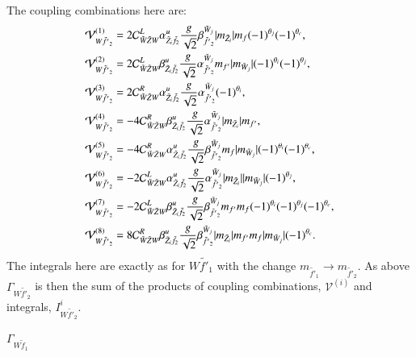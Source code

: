 \documentclass[final,3p,times,pdflatex]{elsarticle}
\begin{document}
The coupling combinations here are:
\begin{align}
\mathcal{V}_{W \tilde{f'}_2}^{(1)} &= 2 \mathcal{C}_{\tilde{W} \tilde{Z} W}^L \alpha_{\tilde{Z}_i \tilde{f}_2}^{u} {g \over \sqrt{2}} \beta_{\tilde{f'}_2}^{\tilde{W}_j} |m_{\tilde{Z}_i}| m_{f}(-1)^{\theta_j}(-1)^{\theta_c}, \\
\mathcal{V}_{W \tilde{f'}_2}^{(2)} &= 2 \mathcal{C}_{\tilde{W} \tilde{Z} W}^L \beta_{\tilde{Z}_i \tilde{f}_2}^{u} {g \over \sqrt{2}} \alpha_{\tilde{f'}_2}^{\tilde{W}_j} m_{f'}|m_{\tilde{W}_j}|(-1)^{\theta_i}(-1)^{\theta_j}, \\
\mathcal{V}_{W \tilde{f'}_2}^{(3)} &= 2 \mathcal{C}_{\tilde{W} \tilde{Z} W}^R \alpha_{\tilde{Z}_i \tilde{f}_2}^{u} {g \over \sqrt{2}} \alpha_{\tilde{f'}_2}^{\tilde{W}_j}(-1)^{\theta_i}, \\
\mathcal{V}_{W \tilde{f'}_2}^{(4)} &= -4 \mathcal{C}_{\tilde{W} \tilde{Z} W}^R \beta_{\tilde{Z}_i \tilde{f}_2}^{u} {g \over \sqrt{2}} \alpha_{\tilde{f'}_2}^{\tilde{W}_j}|m_{\tilde{Z}_i}|m_{f'}, \\
\mathcal{V}_{W \tilde{f'}_2}^{(5)} &= -4 \mathcal{C}_{\tilde{W} \tilde{Z} W}^R \alpha_{\tilde{Z}_i \tilde{f}_2}^{u} {g \over \sqrt{2}} \beta_{\tilde{f'}_2}^{\tilde{W}_j}m_{f}|m_{\tilde{W}_j}|(-1)^{\theta_i}(-1)^{\theta_c}, \\
\mathcal{V}_{W \tilde{f'}_2}^{(6)} &= -2 \mathcal{C}_{\tilde{W} \tilde{Z} W}^L \alpha_{\tilde{Z}_i \tilde{f}_2}^{u} {g \over \sqrt{2}} \alpha_{\tilde{f'}_2}^{\tilde{W}_j} |m_{\tilde{Z}_i}||m_{\tilde{W}_j}|(-1)^{\theta_j}, \\
\mathcal{V}_{W \tilde{f'}_2}^{(7)} &= -2 \mathcal{C}_{\tilde{W} \tilde{Z} W}^L \beta_{\tilde{Z}_i \tilde{f}_2}^{u} {g \over \sqrt{2}} \beta_{\tilde{f'}_2}^{\tilde{W}_j} m_{f'} m_{f} (-1)^{\theta_i}(-1)^{\theta_j} (-1)^{\theta_c}, \\
\mathcal{V}_{W \tilde{f'}_2}^{(8)} &= 8 \mathcal{C}_{\tilde{W} \tilde{Z} W}^R \beta_{\tilde{Z}_i \tilde{f}_2}^{u} {g \over \sqrt{2}} \beta_{\tilde{f'}_2}^{\tilde{W}_j} |m_{\tilde{Z}_i}| m_{f'} m_{f}|m_{\tilde{W}_j}|(-1)^{\theta_c}.
\end{align}
The integrals here are exactly as for $W \tilde{f'}_1$ with the change $m_{\tilde{f'}_1} \rightarrow m_{\tilde{f'}_2}$. As above $\Gamma_{W \tilde{f'}_2}$ is then the sum of the products of coupling combinations, $\mathcal{V}^{(i)}$ and integrals, $I_{W \tilde{f'}_2}^{i}$.

\textbf{\underline{$\Gamma_{W \tilde{f}_1}$}}
\end{document}
